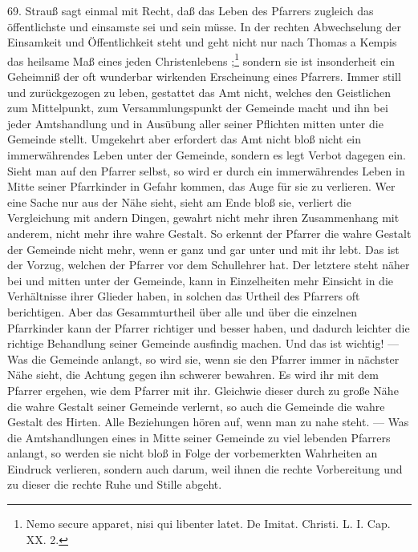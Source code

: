69. Strauß sagt einmal mit Recht, daß das Leben des Pfarrers zugleich das öffentlichste und einsamste sei und sein müsse. In der rechten Abwechselung der Einsamkeit und Öffentlichkeit steht und geht nicht nur nach Thomas a Kempis das heilsame Maß eines jeden Christenlebens%
%
;\footnote{Nemo secure apparet, nisi qui libenter latet. De Imitat. Christi. L. I. Cap. XX. 2.} sondern sie ist insonderheit ein Geheimniß der oft wunderbar wirkenden Erscheinung eines Pfarrers. Immer still und zurückgezogen zu leben, gestattet das Amt nicht, welches den Geistlichen zum Mittelpunkt, zum Versammlungspunkt der Gemeinde macht und ihn bei jeder Amtshandlung und in Ausübung aller seiner Pflichten mitten unter die Gemeinde stellt. Umgekehrt aber erfordert das Amt nicht bloß nicht ein immerwährendes Leben unter der Gemeinde, sondern es legt Verbot dagegen ein. Sieht man auf den Pfarrer selbst, so wird er durch ein immerwährendes Leben in Mitte seiner Pfarrkinder in Gefahr kommen, das Auge für sie zu verlieren. Wer eine Sache nur aus der Nähe sieht, sieht am Ende bloß sie, verliert die Vergleichung mit andern Dingen, gewahrt nicht mehr ihren Zusammenhang mit anderem, nicht mehr ihre wahre Gestalt. So erkennt der Pfarrer die wahre Gestalt der Gemeinde nicht mehr, wenn er ganz und gar unter und mit ihr lebt. Das ist der Vorzug, welchen der Pfarrer vor dem Schullehrer hat. Der letztere steht näher bei und mitten unter der Gemeinde, kann in Einzelheiten mehr Einsicht in die Verhältnisse ihrer Glieder haben, in solchen das Urtheil des Pfarrers oft berichtigen. Aber das Gesammturtheil über alle und über die einzelnen Pfarrkinder kann der Pfarrer richtiger und besser haben, und dadurch leichter die richtige Behandlung seiner Gemeinde ausfindig machen. Und das ist wichtig! — Was die Gemeinde
anlangt, so wird sie, wenn sie den Pfarrer immer in nächster Nähe sieht, die Achtung gegen ihn schwerer bewahren. Es wird ihr mit dem Pfarrer ergehen, wie dem Pfarrer mit ihr. Gleichwie dieser durch zu große Nähe die wahre Gestalt seiner Gemeinde verlernt, so auch die Gemeinde die wahre Gestalt des Hirten. Alle Beziehungen hören auf, wenn man zu nahe steht. — Was die Amtshandlungen eines in Mitte seiner Gemeinde zu viel lebenden Pfarrers anlangt, so werden sie nicht bloß in Folge der vorbemerkten Wahrheiten an Eindruck verlieren, sondern auch darum, weil ihnen die rechte Vorbereitung und zu dieser die rechte Ruhe und Stille abgeht.

